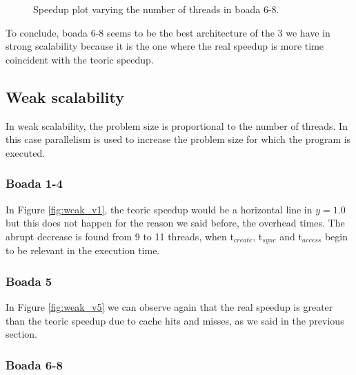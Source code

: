 \documentclass[12pt, a4paper]{article}
\begin{document}
\begin{figure}[H]
\begin{minipage}[b]{0.45\linewidth}
\caption{Speedup plot varying the number of threads in boada 6-8.}
\label{fig:strong_v7_2}
\end{minipage}
\end{figure}

To conclude, boada 6-8 seems to be the best architecture of the 3 we have in strong scalability because it is the one where the real speedup is more time coincident with the teoric speedup.

\subsection{Weak scalability}

In weak scalability, the problem size is proportional to the number of threads. In this case parallelism is used to increase the problem size for which the program is executed.

\subsubsection{Boada 1-4}

In Figure \ref{fig:weak_v1}, the teoric speedup would be a horizontal line in $y = 1.0$ but this does not happen for the reason we said before, the overhead times. The abrupt decrease is found from 9 to 11 threads, when t$_{create}$, t$_{sync}$ and t$_{access}$ begin to be relevant in the execution time.


\subsubsection{Boada 5}

In Figure \ref{fig:weak_v5} we can observe again that the real speedup is greater than the teoric speedup due to cache hits and misses, as we said in the previous section.


\subsubsection{Boada 6-8}
\end{document}
